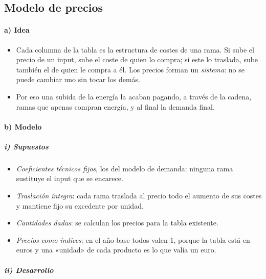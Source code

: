 \documentclass[11pt]{article}
\begin{document}
\subsection{Modelo de precios}\label{sec:precios}

\paragraph{a) Idea}

\begin{itemize}
\item Cada columna de la tabla es la estructura de costes de una rama. Si sube el precio de un input, sube el coste de quien lo compra; si este lo traslada, sube también el de quien le compra a él. Los precios forman un \emph{sistema}: no se puede cambiar uno sin tocar los demás.
\item Por eso una subida de la energía la acaban pagando, a través de la cadena, ramas que apenas compran energía, y al final la demanda final.
\end{itemize}

\paragraph{b) Modelo}

\subparagraph{i) Supuestos}

\begin{itemize}
\item \emph{Coeficientes técnicos fijos}, los del modelo de demanda: ninguna rama sustituye el input que se encarece.
\item \emph{Traslación íntegra}: cada rama traslada al precio todo el aumento de sus costes y mantiene fijo su excedente por unidad.
\item \emph{Cantidades dadas}: se calculan los precios para la tabla existente.
\item \emph{Precios como índices}: en el año base todos valen 1, porque la tabla está en euros y una «unidad» de cada producto es lo que valía un euro.
\end{itemize}

\subparagraph{ii) Desarrollo}
\end{document}
